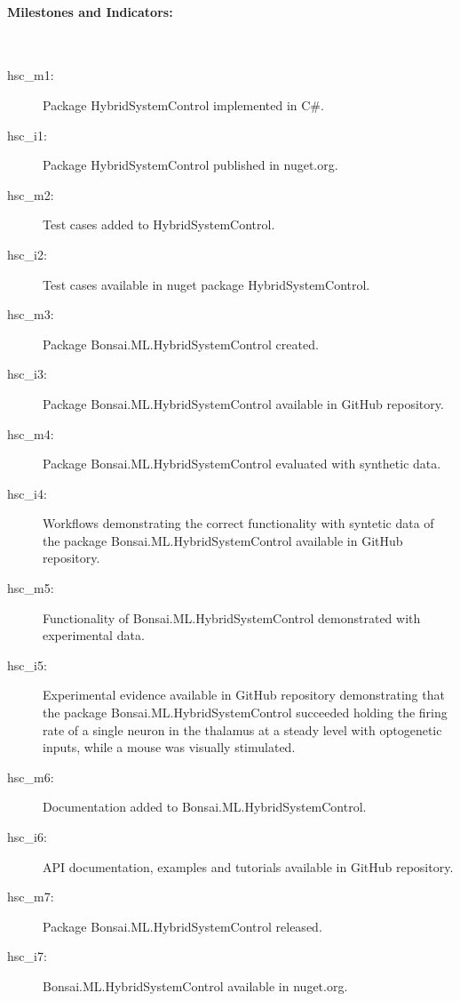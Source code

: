 \paragraph{Milestones and Indicators:}\mbox{}\\

\begin{description}

    \item[hsc\_m1:] Package HybridSystemControl implemented in C\#.

    \item[hsc\_i1:] Package HybridSystemControl published in nuget.org.

    \item[hsc\_m2:] Test cases added  to HybridSystemControl.

    \item[hsc\_i2:] Test cases available in nuget package HybridSystemControl.

    \item[hsc\_m3:] Package Bonsai.ML.HybridSystemControl created.

    \item[hsc\_i3:] Package Bonsai.ML.HybridSystemControl available in GitHub
        repository.

    \item[hsc\_m4:] Package Bonsai.ML.HybridSystemControl evaluated with
        synthetic data.

    \item[hsc\_i4:] Workflows demonstrating the correct functionality with
        syntetic data of the package Bonsai.ML.HybridSystemControl available in
        GitHub repository.

    \item[hsc\_m5:] Functionality of Bonsai.ML.HybridSystemControl demonstrated
        with experimental data.

    \item[hsc\_i5:] Experimental evidence available in GitHub repository demonstrating that the package
        Bonsai.ML.HybridSystemControl succeeded holding the firing rate of a
        single neuron in the thalamus at a steady level with optogenetic
        inputs, while a mouse was visually stimulated.

    \item[hsc\_m6:] Documentation added to Bonsai.ML.HybridSystemControl.

    \item[hsc\_i6:] API documentation, examples and tutorials available in
        GitHub repository.

    \item[hsc\_m7:] Package Bonsai.ML.HybridSystemControl released.

    \item[hsc\_i7:] Bonsai.ML.HybridSystemControl available in nuget.org.

\end{description}

